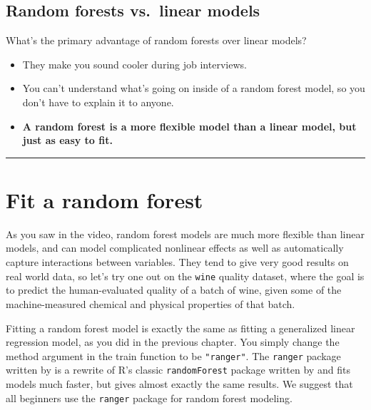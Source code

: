 \documentclass[
]{book}
\begin{document}
\hypertarget{random-forests-vs.-linear-models}{%
\subsection*{Random forests vs.~linear models}\label{random-forests-vs.-linear-models}}

What's the primary advantage of random forests over linear models?

\begin{itemize}
\item
  They make you sound cooler during job interviews.
\item
  You can't understand what's going on inside of a random forest model, so you don't have to explain it to anyone.
\item
  \textbf{A random forest is a more flexible model than a linear model, but just as easy to fit.}
\end{itemize}

\begin{center}\rule{0.5\linewidth}{0.5pt}\end{center}

\hypertarget{fit-a-random-forest}{%
\section{Fit a random forest}\label{fit-a-random-forest}}

As you saw in the video, random forest models are much more flexible than linear models, and can model complicated nonlinear effects as well as automatically capture interactions between variables. They tend to give very good results on real world data, so let's try one out on the \texttt{wine} quality dataset, where the goal is to predict the human-evaluated quality of a batch of wine, given some of the machine-measured chemical and physical properties of that batch.

Fitting a random forest model is exactly the same as fitting a generalized linear regression model, as you did in the previous chapter. You simply change the method argument in the train function to be \texttt{"ranger"}. The \texttt{ranger} package written by \citet{R-ranger} is a rewrite of R's classic \texttt{randomForest} package written by \citet{R-randomForest} and fits models much faster, but gives almost exactly the same results. We suggest that all beginners use the \texttt{ranger} package for random forest modeling.
\end{document}

